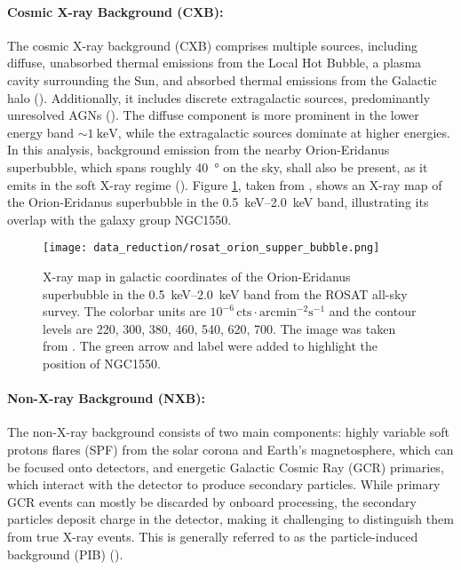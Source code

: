 \paragraph*{Cosmic X-ray Background (CXB):} The cosmic X-ray background (CXB) comprises multiple sources, including diffuse, unabsorbed thermal emissions from the Local Hot Bubble, a plasma cavity surrounding the Sun, and absorbed thermal emissions from the Galactic halo (\cite{galeazzi2006xmm}). Additionally, it includes discrete extragalactic sources, predominantly unresolved AGNs  (\cite{brandt2005deep}). The diffuse component is more prominent in the lower energy band \(\sim\SI{1}{\kilo\electronvolt}\), while the extragalactic sources dominate at higher energies. In this analysis, background emission from the nearby Orion-Eridanus superbubble, which spans roughly \SI{40}{\degree} on the sky, shall also be present, as it emits in the soft X-ray regime (\cite{Krause_2014}). Figure \ref{fig:orion_superbubble}, taken from \cite{Krause_2014}, shows an X-ray map of the Orion-Eridanus superbubble in the \SIrange{0.5}{2.0}{\kilo\electronvolt} band, illustrating its overlap with the galaxy group NGC1550.
\begin{figure}[htbp]
    \centering
    \texttt{[image: data\_reduction/rosat\_orion\_supper\_bubble.png]}
    \caption{X-ray map in galactic coordinates of the Orion-Eridanus superbubble in the \SIrange{0.5}{2.0}{\kilo\electronvolt} band from the ROSAT all-sky survey. The colorbar units are \(10^{-6}\,\text{cts}\cdot\text{arcmin}^{-2}\text{s}^{-1}\) and the contour levels are 220, 300, 380,
    460, 540, 620, 700. The image was taken from \cite{Krause_2014}. The green arrow and label were added to highlight the position of NGC1550.}
    \label{fig:orion_superbubble}
\end{figure}
\paragraph*{Non-X-ray Background (NXB):} The non-X-ray background consists of two main components: highly variable soft protons flares (SPF) from the solar corona and Earth's magnetosphere, which can be focused onto detectors, and energetic Galactic Cosmic Ray (GCR) primaries, which interact with the detector to produce secondary particles. While primary GCR events can mostly be discarded by onboard processing, the secondary particles deposit charge in the detector, making it challenging to distinguish them from true X-ray events. This is generally referred to as the particle-induced background (PIB) (\cite{Bulbul_2020}). 

